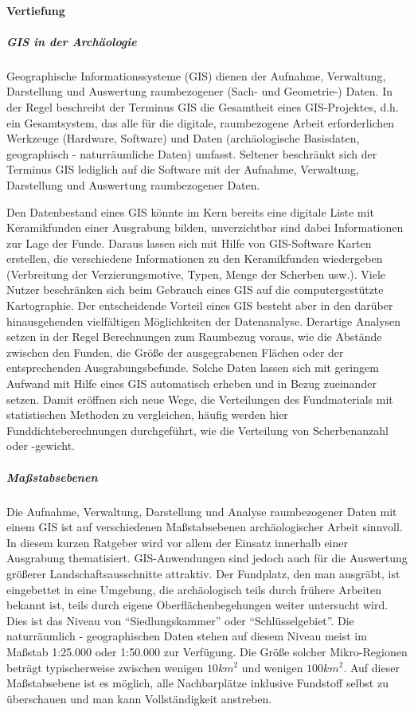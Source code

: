 \paragraph{Vertiefung}
\subparagraph{GIS in der Archäologie} Geographische Informationssysteme (GIS) dienen der Aufnahme, Verwaltung, Darstellung und Auswertung raumbezogener (Sach- und Geometrie-) Daten. In der Regel beschreibt der Terminus GIS die Gesamtheit eines GIS-Projektes, d.h. ein Gesamtsystem, das alle für die digitale, raumbezogene Arbeit erforderlichen Werkzeuge (Hardware, Software) und Daten (archäologische Basisdaten, geographisch - naturräumliche Daten) umfasst. Seltener beschränkt sich der Terminus GIS lediglich auf die Software mit der Aufnahme, Verwaltung, Darstellung und Auswertung raumbezogener Daten. 

Den Datenbestand eines GIS könnte im Kern bereits eine digitale Liste mit Keramikfunden einer Ausgrabung bilden, unverzichtbar sind dabei Informationen zur Lage der Funde. Daraus lassen sich mit Hilfe von GIS-Software Karten erstellen, die verschiedene Informationen zu den Keramikfunden wiedergeben (Verbreitung der Verzierungsmotive, Typen, Menge der Scherben usw.). Viele Nutzer beschränken sich beim Gebrauch eines GIS auf die  computergestützte Kartographie. Der entscheidende Vorteil eines GIS besteht aber in den darüber hinausgehenden vielfältigen Möglichkeiten der Datenanalyse. Derartige Analysen setzen in der Regel Berechnungen zum Raumbezug voraus, wie die Abstände zwischen den Funden, die Größe der ausgegrabenen Flächen oder der entsprechenden Ausgrabungsbefunde. Solche Daten lassen sich mit geringem Aufwand mit Hilfe eines GIS automatisch erheben und in Bezug zueinander setzen. Damit eröffnen sich neue Wege, die Verteilungen des Fundmaterials mit statistischen Methoden zu vergleichen, häufig werden hier Funddichteberechnungen  durchgeführt, wie die Verteilung von Scherbenanzahl oder -gewicht. 

\subparagraph{Maßstabsebenen}Die Aufnahme, Verwaltung, Darstellung  und Analyse raumbezogener Daten mit einem GIS ist auf verschiedenen Maßstabsebenen archäologischer Arbeit sinnvoll. In diesem kurzen Ratgeber wird vor allem der Einsatz innerhalb einer Ausgrabung thematisiert. GIS-Anwendungen sind jedoch auch für die Auswertung größerer Landschaftsausschnitte attraktiv. Der Fundplatz, den man ausgräbt, ist eingebettet in eine Umgebung, die archäologisch teils durch frühere Arbeiten bekannt ist, teils durch eigene Oberflächenbegehungen weiter untersucht wird. Dies ist das Niveau von "`Siedlungskammer"' oder "`Schlüsselgebiet"'. Die naturräumlich - geographischen Daten stehen auf diesem Niveau meist im Maßstab 1:25.000 oder 1:50.000 zur Verfügung. Die Größe solcher Mikro-Regionen beträgt typischerweise zwischen wenigen $10 km^2$ und wenigen $100 km^2$. Auf dieser Maßstabsebene ist es möglich, alle Nachbarplätze inklusive Fundstoff selbst zu überschauen und man kann Vollständigkeit anstreben.

